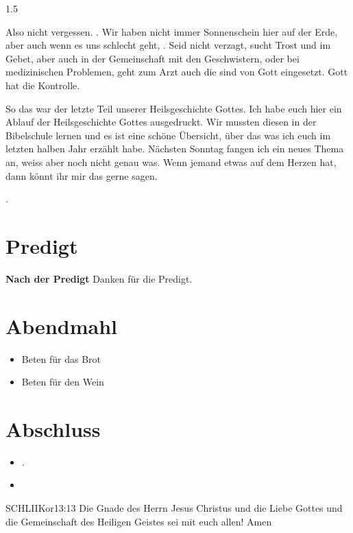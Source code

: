 \documentclass[fontsize=14pt]{../../inc/mybib}
\begin{document}
\begin{spacing}{1.5}
\begin{block}
        Also nicht vergessen. . Wir haben nicht immer Sonnenschein hier auf der Erde, aber auch wenn es uns schlecht geht, . Seid nicht verzagt, sucht Trost und  im Gebet, aber auch in der Gemeinschaft mit den Geschwistern, oder bei medizinischen Problemen, geht zum Arzt auch die sind von Gott eingesetzt. Gott hat die Kontrolle.      
    \end{block}
    \begin{block}[Ende]
        So das war der letzte Teil unserer Heilsgeschichte Gottes. Ich habe euch hier ein Ablauf der Heilsgeschichte Gottes ausgedruckt. Wir mussten diesen in der Bibelschule lernen und es ist eine schöne Übersicht, über das was ich euch im letzten halben Jahr erzählt habe. Nächsten Sonntag fangen ich ein neues Thema an, weiss aber noch nicht genau was. Wenn jemand etwas auf dem Herzen hat, dann könnt ihr mir das gerne sagen. 
    \end{block}
    .
\end{spacing}
\section{Predigt}
\textbf{Nach der Predigt}\newline
Danken für die Predigt.
\section{Abendmahl}
\begin{itemize}
    \item [] Beten für das Brot
    \item [] Beten für den Wein
\end{itemize}
\section{Abschluss}
\begin{itemize}
    \item [] .
    \item [] 
\end{itemize}
\begin{bibelbox}{SCHL}{IIKor}{13:13}
    Die Gnade des Herrn Jesus Christus und die Liebe Gottes und die Gemeinschaft des Heiligen Geistes sei mit euch allen! Amen
\end{bibelbox}
\end{document}
